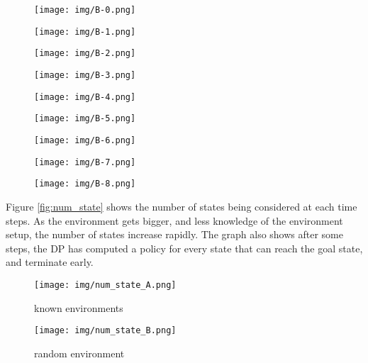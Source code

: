 \documentclass[conference]{IEEEtran}
\begin{document}
\begin{figure*}
    \centering
    \begin{subfigure}{0.3\textwidth}
    \texttt{[image: img/B-0.png]}
    \end{subfigure}
    \hfill
    \begin{subfigure}{0.3\textwidth}
    \texttt{[image: img/B-1.png]}
    \end{subfigure}
    \hfill
    \begin{subfigure}{0.3\textwidth}
    \texttt{[image: img/B-2.png]}
    \end{subfigure}
    
    \begin{subfigure}{0.3\textwidth}
    \texttt{[image: img/B-3.png]}
    \end{subfigure}
    \hfill
    \begin{subfigure}{0.3\textwidth}
    \texttt{[image: img/B-4.png]}
    \end{subfigure}
    \hfill
    \begin{subfigure}{0.3\textwidth}
    \texttt{[image: img/B-5.png]}
    \end{subfigure}
    
    \begin{subfigure}{0.3\textwidth}
    \texttt{[image: img/B-6.png]}
    \end{subfigure}
    \hfill
    \begin{subfigure}{0.3\textwidth}
    \texttt{[image: img/B-7.png]}
    \end{subfigure}
    \hfill
    \begin{subfigure}{0.3\textwidth}
    \texttt{[image: img/B-8.png]}
    \end{subfigure}
\caption{optimal control sequence of one random environments}
\label{fig:random_seq}
\end{figure*}


Figure \ref{fig:num_state} shows the number of states being considered
at each time steps. 
As the environment gets bigger, 
and less knowledge of the environment setup,
the number of states increase rapidly.
The graph also shows after some steps, 
the DP has computed a policy for every state that can reach the goal state,
and terminate early.

\begin{figure*}
    \centering
    \begin{subfigure}{0.45\textwidth}
    \texttt{[image: img/num\_state\_A.png]}
    \caption{known environments}
    \end{subfigure}
    \begin{subfigure}{0.45\textwidth}
    \texttt{[image: img/num\_state\_B.png]}
    \caption{random environment}
    \end{subfigure}
\caption{number of state been considered at each time steps }
\label{fig:num_state}
\end{figure*}
\end{document}
